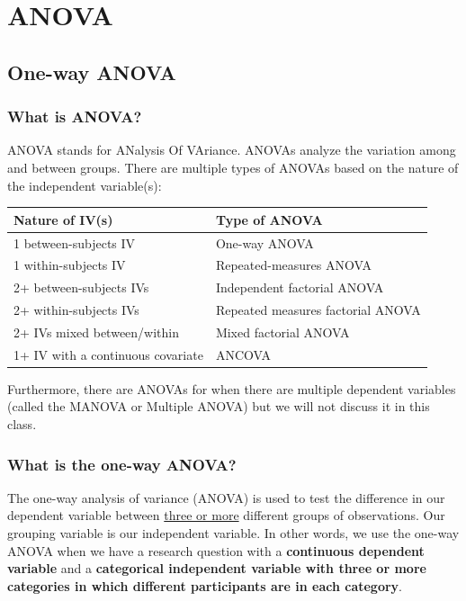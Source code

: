 \documentclass[
]{book}
\begin{document}
\hypertarget{part-anova}{%
\part{ANOVA}\label{part-anova}}

\hypertarget{one-way-anova}{%
\chapter{One-way ANOVA}\label{one-way-anova}}

\hypertarget{what-is-anova}{%
\section{What is ANOVA?}\label{what-is-anova}}

ANOVA stands for ANalysis Of VAriance. ANOVAs analyze the variation among and between groups. There are multiple types of ANOVAs based on the nature of the independent variable(s):

\begin{longtable}[]{@{}ll@{}}
\toprule
\textbf{Nature of IV(s)} & \textbf{Type of ANOVA}\tabularnewline
\midrule
\endhead
1 between-subjects IV & One-way ANOVA\tabularnewline
1 within-subjects IV & Repeated-measures ANOVA\tabularnewline
2+ between-subjects IVs & Independent factorial ANOVA\tabularnewline
2+ within-subjects IVs & Repeated measures factorial ANOVA\tabularnewline
2+ IVs mixed between/within & Mixed factorial ANOVA\tabularnewline
1+ IV with a continuous covariate & ANCOVA\tabularnewline
\bottomrule
\end{longtable}

Furthermore, there are ANOVAs for when there are multiple dependent variables (called the MANOVA or Multiple ANOVA) but we will not discuss it in this class.

\hypertarget{what-is-the-one-way-anova}{%
\section{What is the one-way ANOVA?}\label{what-is-the-one-way-anova}}

The one-way analysis of variance (ANOVA) is used to test the difference in our dependent variable between \underline{three or more} different groups of observations. Our grouping variable is our independent variable. In other words, we use the one-way ANOVA when we have a research question with a \textbf{continuous dependent variable} and a \textbf{categorical independent variable with three or more categories in which different participants are in each category}.
\end{document}
